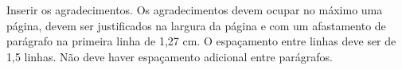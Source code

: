 \begin{agradece}	%

Inserir os agradecimentos. Os agradecimentos devem ocupar no máximo uma página, devem ser justificados na largura da página e com um afastamento de parágrafo na primeira linha de 1,27 cm. O espaçamento entre linhas deve ser de 1,5 linhas. Não deve haver espaçamento adicional entre parágrafos.

\lipsum[2-5]	%

\end{agradece}

